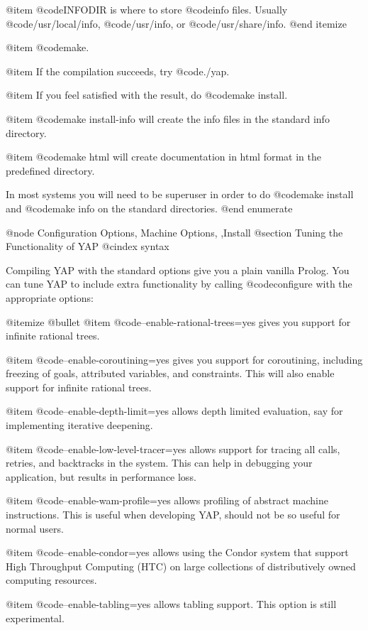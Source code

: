 @item @code{INFODIR} is where to store @code{info} files. Usually
@code{/usr/local/info}, @code{/usr/info}, or @code{/usr/share/info}.
@end itemize

@item @code{make}.

@item If the compilation succeeds, try @code{./yap}.

@item If you feel satisfied with the result, do @code{make install}.

@item @code{make install-info} will create the info files in the
standard info directory.

@item @code{make html} will create documentation in html format in the
predefined directory.

In most systems you will need to be superuser in order to do @code{make
install} and @code{make info} on the standard directories.
@end enumerate

@node Configuration Options, Machine Options, ,Install
@section Tuning the Functionality of YAP 
@cindex syntax

Compiling YAP with the standard options give you a plain vanilla
Prolog. You can tune YAP to include extra functionality by calling
@code{configure} with the appropriate options:

@itemize @bullet
 @item @code{--enable-rational-trees=yes} gives you support for infinite
rational trees.

 @item @code{--enable-coroutining=yes} gives you support for coroutining,
including freezing of goals, attributed variables, and
constraints. This will also enable support for infinite rational
trees.

 @item @code{--enable-depth-limit=yes} allows depth limited evaluation, say for
implementing iterative deepening.

 @item @code{--enable-low-level-tracer=yes} allows support for tracing all calls,
retries, and backtracks in the system. This can help in debugging your
application, but results in performance loss.

 @item @code{--enable-wam-profile=yes} allows profiling of abstract machine
instructions. This is useful when developing YAP, should not be so
useful for normal users.

 @item @code{--enable-condor=yes} allows using the Condor system that
support High Throughput Computing (HTC) on large collections of
distributively owned computing resources.

 @item @code{--enable-tabling=yes} allows tabling support. This option
is still experimental.

